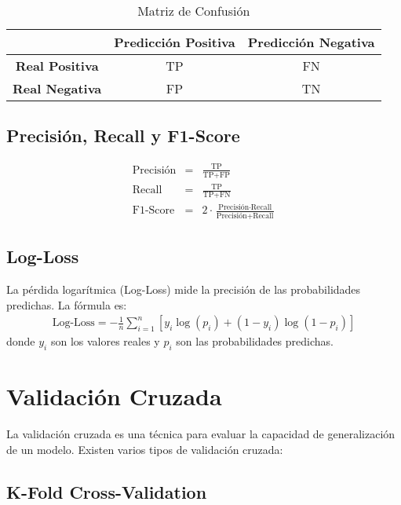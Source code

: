 \begin{table}[h]
\centering
\begin{tabular}{|c|c|c|}
\hline
 & \textbf{Predicción Positiva} & \textbf{Predicción Negativa} \\
\hline
\textbf{Real Positiva} & TP & FN \\
\hline
\textbf{Real Negativa} & FP & TN \\
\hline
\end{tabular}
\caption{Matriz de Confusión}
\label{tab:confusion_matrix}
\end{table}

\subsection{Precisión, Recall y F1-Score}

\begin{eqnarray*}
\text{Precisión} &=& \frac{\text{TP}}{\text{TP} + \text{FP}} \\
\text{Recall} &=& \frac{\text{TP}}{\text{TP} + \text{FN}} \\
\text{F1-Score} &=& 2 \cdot \frac{\text{Precisión} \cdot \text{Recall}}{\text{Precisión} + \text{Recall}}
\end{eqnarray*}

\subsection{Log-Loss}

La pérdida logarítmica (Log-Loss) mide la precisión de las probabilidades predichas. La fórmula es:
\begin{eqnarray*}
\text{Log-Loss} = -\frac{1}{n} \sum_{i=1}^{n} \left[ y_i \log(p_i) + (1 - y_i) \log(1 - p_i) \right]
\end{eqnarray*}
donde $y_i$ son los valores reales y $p_i$ son las probabilidades predichas.

\section{Validación Cruzada}

La validación cruzada es una técnica para evaluar la capacidad de generalización de un modelo. Existen varios tipos de validación cruzada:

\subsection{K-Fold Cross-Validation}

